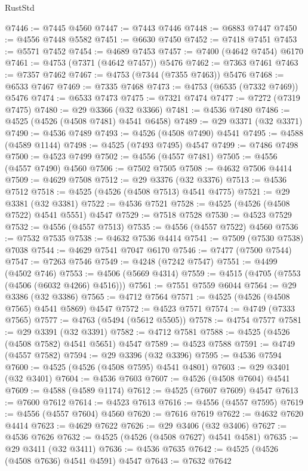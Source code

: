 \begin{lexlean}{RustStd}
\begin{coremodule}
{\begin{coremodule}
{{{{{{{{{{{{{{{{{{{{{{{{{{{{{{{{{{{{{{{{{{{{{{{{{{{{{{{@7446 := @7445 @4560
@7447 := @7443 @7446
@7448 := @6883 @7447
@7450 := @4556 @7448 @5582
@7451 := @6630 @7450
@7452 := @7418 @7451
@7453 := @5571 @7452
@7454 := @4689 @7453
@7457 := @7400 (@4642 @7454) @6170
@7461 := @4753 (@7371 (@4642 @7457)) @5476
@7462 := @7363 @7461
@7463 := @7357 @7462
@7467 := @4753 (@7344 (@7355 @7463)) @5476
@7468 := @6533 @7467
@7469 := @7335 @7468
@7473 := @4753 (@6535 (@7332 @7469)) @5476
@7474 := @6533 @7473
@7475 := @7321 @7474
@7477 := @7272 (@7319 @7475)
@7480 := @29 @3366 (@32 @3366)
@7481 := @4536 @7480
@7486 := @4525 (@4526 (@4508 @7481) @4541 @6458)
@7489 := @29 @3371 (@32 @3371)
@7490 := @4536 @7489
@7493 := @4526 (@4508 @7490) @4541
@7495 := @4588 (@4589 @1144)
@7498 := @4525 (@7493 @7495) @4547
@7499 := @7486 @7498
@7500 := @4523 @7499
@7502 := @4556 (@4557 @7481)
@7505 := @4556 (@4557 @7490) @4560
@7506 := @7502 @7505
@7508 := @4632 @7506 @4414
@7509 := @4629 @7508
@7512 := @29 @3376 (@32 @3376)
@7513 := @4536 @7512
@7518 := @4525 (@4526 (@4508 @7513) @4541 @4775)
@7521 := @29 @3381 (@32 @3381)
@7522 := @4536 @7521
@7528 := @4525 (@4526 (@4508 @7522) @4541 @5551) @4547
@7529 := @7518 @7528
@7530 := @4523 @7529
@7532 := @4556 (@4557 @7513)
@7535 := @4556 (@4557 @7522) @4560
@7536 := @7532 @7535
@7538 := @4632 @7536 @4414
@7541 := @7509 (@7530 @7538) @7038
@7544 := @4629 @7541 @7047 @6170
@7546 := @7477 (@7500 @7544)
@7547 := @7263 @7546
@7549 := @4248 (@7242 @7547)
@7551 := @4499 (@4502 @746)
@7553 := @4506 (@5669 @4314)
@7559 := @4515 (@4705 (@7553 (@4506 (@6032 @4266) @4516)))
@7561 := @7551 @7559 @6044
@7564 := @29 @3386 (@32 @3386)
@7565 := @4712 @7564
@7571 := @4525 (@4526 (@4508 @7565) @4541 @5869) @4547
@7572 := @4523 @7571
@7574 := @4749 (@7333 @7565)
@7577 := @4763 (@5494 (@5612 @5505))
@7578 := @4754 @7577
@7581 := @29 @3391 (@32 @3391)
@7582 := @4712 @7581
@7588 := @4525 (@4526 (@4508 @7582) @4541 @5651) @4547
@7589 := @4523 @7588
@7591 := @4749 (@4557 @7582)
@7594 := @29 @3396 (@32 @3396)
@7595 := @4536 @7594
@7600 := @4525 (@4526 (@4508 @7595) @4541 @4801)
@7603 := @29 @3401 (@32 @3401)
@7604 := @4536 @7603
@7607 := @4526 (@4508 @7604) @4541
@7609 := @4588 (@4589 @1174)
@7612 := @4525 (@7607 @7609) @4547
@7613 := @7600 @7612
@7614 := @4523 @7613
@7616 := @4556 (@4557 @7595)
@7619 := @4556 (@4557 @7604) @4560
@7620 := @7616 @7619
@7622 := @4632 @7620 @4414
@7623 := @4629 @7622
@7626 := @29 @3406 (@32 @3406)
@7627 := @4536 @7626
@7632 := @4525 (@4526 (@4508 @7627) @4541 @4581)
@7635 := @29 @3411 (@32 @3411)
@7636 := @4536 @7635
@7642 := @4525 (@4526 (@4508 @7636) @4541 @4591) @4547
@7643 := @7632 @7642
}}}}}}}}}}}}}}}}}}}}}}}}}}}}}}}}}}}}}}}}}}}}}}}}}}}}}}}
\end{coremodule}}
\end{coremodule}
\end{lexlean}

